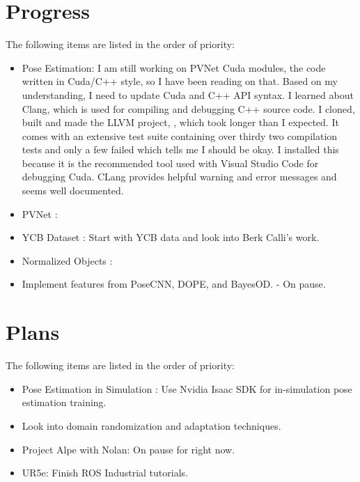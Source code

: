 \documentclass[11pt]{article}
\begin{document}
\section{Progress}
The following items are listed in the order of priority:
\begin{itemize}
      \item Pose Estimation: I am still working on PVNet Cuda modules, the code
      written in Cuda/C++ style, so I have been reading on that. Based on my
      understanding, I need to update Cuda and C++ API syntax. I learned about
      Clang, which is used for compiling and debugging C++ source code. I
      cloned, built and made the LLVM project, \cite{TheLLVMC47:online}, which
      took longer than I expected. It comes with an extensive test suite
      \cite{testsuit42:online} containing over
      thirdy two compilation tests and only a few failed which tells me I
      should be okay. I installed this because it is the recommended tool used
      with Visual Studio Code for debugging Cuda. CLang provides helpful
      warning and error messages and seems well documented.


      \item PVNet \cite{peng2019pvnet}:

      \item YCB Dataset \cite{calli2015ycb}: Start with YCB data and look into
      Berk Calli's work.
      \item Normalized Objects \cite{Wang_2019_CVPR}:
      \item Implement features from PoseCNN, DOPE, and BayesOD. - On pause.
\end{itemize}


\section{Plans}
The following items are listed in the order of priority:

\begin{itemize}
      \item Pose Estimation in Simulation \cite{NVIDIAIs75:online}: Use Nvidia
      Isaac SDK for in-simulation pose estimation training.
      \item Look into domain randomization and adaptation techniques.
      \item Project Alpe with Nolan: On pause for right now.
      \item UR5e: Finish ROS Industrial tutorials.
\end{itemize}
\end{document}
